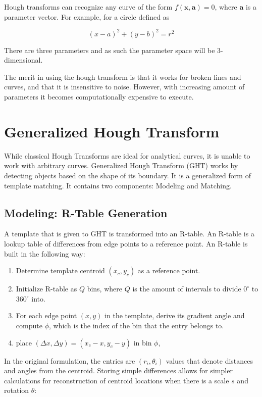 \documentclass{article}
\begin{document}
\begin{multicols}{2}
Hough transforms can recognize any curve of the form $f(\mathbf{x}, \mathbf{a}) = 0$, where $\mathbf{a}$ is a parameter vector. For example, for a circle defined as 

$$
(x-a)^2 + (y-b)^2 = r^2
$$

There are three parameters and as such the parameter space will be 3-dimensional.

The merit in using the hough transform is that it works for broken lines and curves, and that it is insensitive to noise. However, with increasing amount of parameters it becomes computationally expensive to execute.

\section{Generalized Hough Transform}

While classical Hough Transforms are ideal for analytical curves, it is unable to work with arbitrary curves. Generalized Hough Transform (GHT) works by detecting objects based on the shape of its boundary. It is a generalized form of template matching. It contains two components: Modeling and Matching.

\subsection{Modeling: R-Table Generation}

A template that is given to GHT is transformed into an R-table. An R-table is a lookup table of differences from edge points to a reference point. An R-table is built in the following way:

\begin{enumerate}
  \item Determine template centroid $(x_c, y_c)$ as a reference point.
  \item Initialize R-table as $Q$ bins, where $Q$ is the amount of intervals to divide $0^{\circ}$ to $360^{\circ}$ into.
  \item For each edge point $(x, y)$ in the template, derive its gradient angle and compute $\phi$, which is the index of the bin that the entry belongs to.
  \item place $(\Delta x, \Delta y) = (x_c-x,y_c-y)$ in bin $\phi$,
\end{enumerate}

In the original formulation, the entries are $(r_i, \theta_i)$ values that denote distances and angles from the centroid. Storing simple differences allows for simpler calculations for reconstruction of centroid locations when there is a scale $s$ and rotation $\theta$:


\end{multicols}
\end{document}
